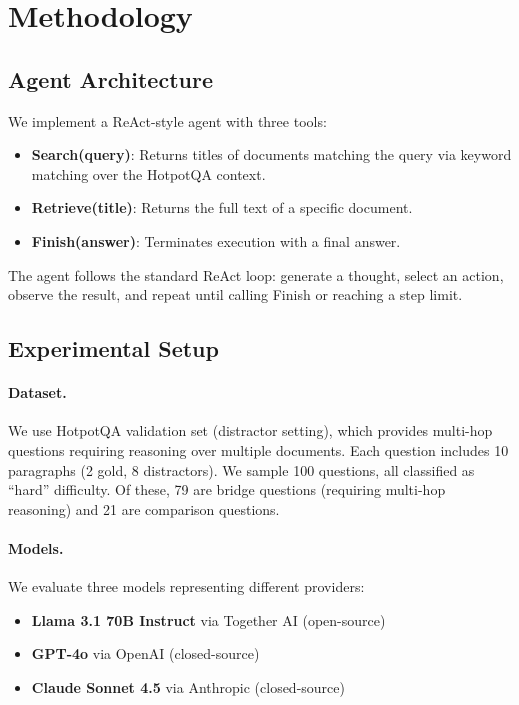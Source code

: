 \documentclass{article}
\begin{document}
\section{Methodology}

\subsection{Agent Architecture}

We implement a ReAct-style agent with three tools:

\begin{itemize}
    \item \textbf{Search(query)}: Returns titles of documents matching the query via keyword matching over the HotpotQA context.
    \item \textbf{Retrieve(title)}: Returns the full text of a specific document.
    \item \textbf{Finish(answer)}: Terminates execution with a final answer.
\end{itemize}

The agent follows the standard ReAct loop: generate a thought, select an action, observe the result, and repeat until calling Finish or reaching a step limit.

\subsection{Experimental Setup}

\paragraph{Dataset.} We use HotpotQA \citep{yang2018hotpotqa} validation set (distractor setting), which provides multi-hop questions requiring reasoning over multiple documents. Each question includes 10 paragraphs (2 gold, 8 distractors). We sample 100 questions, all classified as ``hard'' difficulty. Of these, 79 are bridge questions (requiring multi-hop reasoning) and 21 are comparison questions.

\paragraph{Models.} We evaluate three models representing different providers:
\begin{itemize}
    \item \textbf{Llama 3.1 70B Instruct} via Together AI (open-source)
    \item \textbf{GPT-4o} via OpenAI (closed-source)
    \item \textbf{Claude Sonnet 4.5} via Anthropic (closed-source)
\end{itemize}
\end{document}

